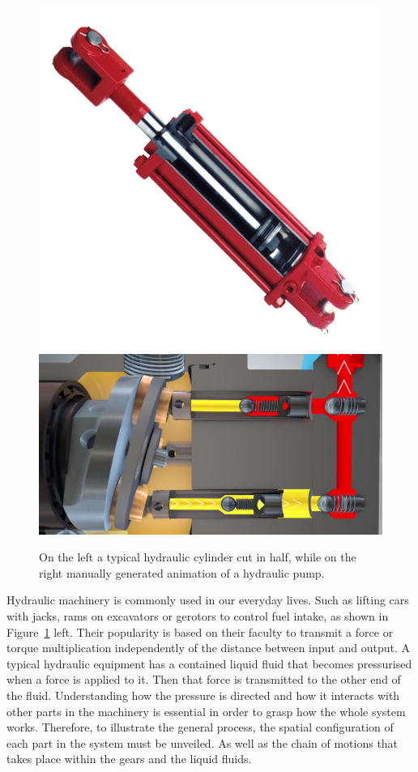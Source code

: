\documentclass[11pt]{report}
\begin{document}
\begin{figure}
\centering
\includegraphics[scale=0.2]{images/h_pump}
\includegraphics[scale=0.3]{images/cylinder_animation}
\caption{On the left a typical hydraulic cylinder cut in half, while on the right manually generated animation of a hydraulic pump.}
\label{fig:cylinder}
\end{figure}

Hydraulic machinery is commonly used in our everyday lives.
Such as lifting cars with jacks, rams on excavators or gerotors to control fuel intake, as shown in Figure~\ref{fig:cylinder} left.
Their popularity is based on their faculty to transmit a force or torque multiplication independently of the distance between input and output.  
A typical hydraulic equipment has a contained liquid fluid that becomes pressurised when a force is applied to it.
Then that force is transmitted to the other end of the fluid. 
Understanding how the pressure is directed and how it interacts with other parts in the machinery is essential in order to grasp how the whole system works. 
Therefore, to illustrate the general process, the spatial configuration of each part in the system must be unveiled.
As well as the chain of motions that takes place within the gears and the liquid fluids.\\
\end{document}
